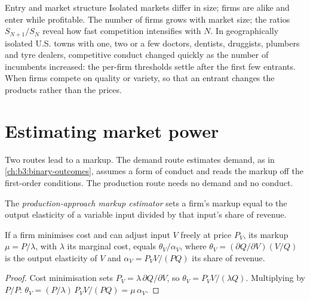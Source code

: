 \begin{model}{Entry and market structure}
\assumes Isolated markets differ in size; firms are alike and enter while profitable.
\predicts The number of firms grows with market size; the ratios $S_{N+1}/S_N$ reveal how fast
competition intensifies with $N$.
\tested In geographically isolated U.S. towns with one, two or a few doctors,
dentists, druggists, plumbers and tyre dealers, competitive conduct changed quickly as
the number of incumbents increased: the per-firm thresholds settle after the first
few entrants. %
\breaks When firms compete on quality or variety, so that an entrant changes the
products rather than the prices.
\end{model}

\section{Estimating market power}\label{sec:b3:oligopoly-and-collusion:markups}

Two routes lead to a markup. The demand route estimates demand, as in
\cref{ch:b3:binary-outcomes}, assumes a form of conduct and reads the markup off the
first-order conditions. The production route needs no demand and no conduct.

\begin{definition}\label{def:b3:oligopoly-and-collusion:markup-estimator}
The \emph{production-approach markup estimator} sets a firm's markup equal to the
output elasticity of a variable input divided by that input's share of revenue.
\end{definition}

\begin{proposition}\label{prop:b3:oligopoly-and-collusion:production}
If a firm minimises cost and can adjust input $V$ freely at price $P_V$, its markup $\mu = P/\lambda$, with $\lambda$
its marginal cost, equals $\theta_V/\alpha_V$, where $\theta_V = (\partial Q/\partial V)(V/Q)$ is the output elasticity of $V$ and
$\alpha_V = P_V V/(PQ)$ its share of revenue.
\end{proposition}

\begin{proof}
Cost minimisation sets $P_V = \lambda\,\partial Q/\partial V$, so $\theta_V = P_V V/(\lambda Q)$. Multiplying by $P/P$:
$\theta_V = (P/\lambda)\,P_V V/(PQ) = \mu\,\alpha_V$.
\end{proof}

